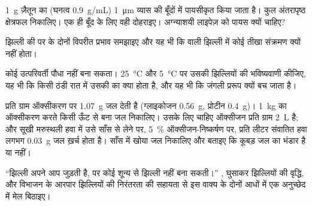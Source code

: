 \begin{exercise}[$\star\star$]\label{exo:b1:lipids:8}
\qty{1}{g} ज़ैतून का  (घनत्व \qty{0.9}{g/mL}) \qty{1}{\micro m}
व्यास की बूँदों में पायसीकृत किया जाता है। कुल अंतरापृष्ठ क्षेत्रफल
निकालिए। एक ही बूँद के लिए वही दोहराइए। अग्न्याशयी लाइपेज़ को पायस क्यों
चाहिए?
\end{exercise}

\begin{exercise}[$\star\star$]\label{exo:b1:lipids:9}
झिल्ली की  पर  के दोनों विपरीत प्रभाव समझाइए और यह भी कि
 वाली झिल्ली में कोई तीखा संक्रमण क्यों नहीं होता।
\end{exercise}

\begin{exercise}[$\star\star\star$]\label{exo:b1:lipids:10}
कोई उत्परिवर्ती पौधा  नहीं बना सकता। \qty{25}{\celsius}
और \qty{5}{\celsius} पर उसकी झिल्लियों की भविष्यवाणी कीजिए, यह भी कि
किसी ठंडी रात में उसकी  का क्या होता है, और यह भी कि जंगली
प्ररूप क्यों बच जाता है।
\end{exercise}

\begin{exercise}[$\star\star\star$]\label{exo:b1:lipids:11}
 प्रति ग्राम ऑक्सीकरण पर \qty{1.07}{g} जल देती है (ग्लाइकोजन
\qty{0.56}{g}, प्रोटीन \qty{0.4}{g})। \qty{1}{kg}  का ऑक्सीकरण करते
किसी ऊँट से बना जल निकालिए। उसके लिए चाहिए ऑक्सीजन प्रति ग्राम 
\qty{2}{L} है; और सूखी मरुस्थली हवा में उसे साँस से लेने पर, \qty{5}{\%}
ऑक्सीजन-निष्कर्षण पर, प्रति लीटर संवातित हवा लगभग \qty{0.03}{g} जल
ख़र्च होता है। साँस में खोया जल निकालिए और बताइए कि कूबड़ जल का भंडार है
या नहीं।
\end{exercise}

\begin{exercise}[$\star\star\star$]\label{exo:b1:lipids:12}
``झिल्ली अपने आप जुड़ती है, पर कोई  शून्य से झिल्ली नहीं बना
सकती।'' ,  घुसाकर झिल्लियों की वृद्धि, और 
विभाजन के आरपार झिल्लियों की निरंतरता की सहायता से इस वाक्य के दोनों
आधों में एक अनुच्छेद में मेल बिठाइए।
\end{exercise}

